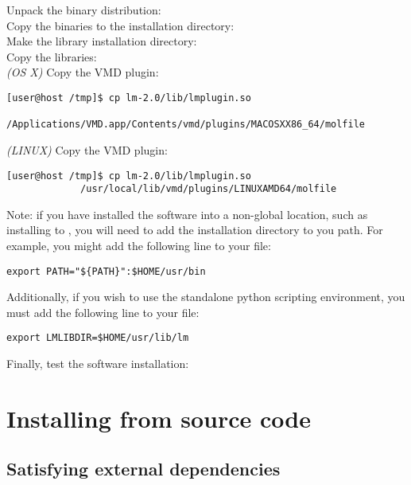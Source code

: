 Unpack the binary distribution: \\

Copy the binaries to the installation directory: \\

Make the library installation directory: \\

Copy the libraries: \\

{\it (OS X)} Copy the VMD plugin:
{\small\begin{verbatim}
[user@host /tmp]$ cp lm-2.0/lib/lmplugin.so
             /Applications/VMD.app/Contents/vmd/plugins/MACOSXX86_64/molfile
\end{verbatim}}

{\it (LINUX)} Copy the VMD plugin:
{\small\begin{verbatim}
[user@host /tmp]$ cp lm-2.0/lib/lmplugin.so
             /usr/local/lib/vmd/plugins/LINUXAMD64/molfile
\end{verbatim}}

Note: if you have installed the software into a non-global location, such as installing to , you will need to add the installation directory to you path. For example, you might add the following line to your  file:
{\small\begin{verbatim}
export PATH="${PATH}":$HOME/usr/bin
\end{verbatim}}

Additionally, if you wish to use the standalone python scripting environment, you must add the following line to your  file:
{\small\begin{verbatim}
export LMLIBDIR=$HOME/usr/lib/lm
\end{verbatim}}

Finally, test the software installation: 

\section{Installing from source code}

\subsection{Satisfying external dependencies}

